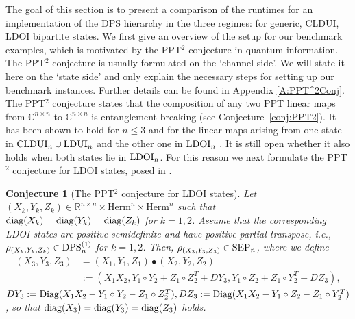 \documentclass[11pt]{article}
\newcommand{\R}{\ensuremath{\mathbb{R}}}   %
\newcommand{\C}{\ensuremath{\mathbb{C}}} %
\newcommand{\Herm}{\mathrm{Herm}}
\newcommand{\SEP}{\text{\rm SEP}}
\newcommand{\CLDUI}{\text{\rm CLDUI}}
\newcommand{\LDUI}{\text{\rm LDUI}}
\newcommand{\LDOI}{\text{\rm LDOI}}
\newcommand{\DPS}{\text{\rm DPS}}
\newcommand{\diag}{\text{\rm diag}}
\newcommand{\Diag}{\text{\rm Diag}}
\theoremstyle{plain}
\newtheorem{conjecture}[satz]{Conjecture}
\begin{document}
The goal of this section is to present a comparison of the runtimes for an implementation of the DPS hierarchy in the three   regimes: for generic, CLDUI,  LDOI bipartite states. We first give an overview of the setup for our benchmark examples, which is motivated by the PPT$^2$ conjecture in quantum information. The PPT$^2$ conjecture is usually formulated on the `channel side'. We will state it here on the `state side' and only explain the necessary steps for setting up our benchmark instances. Further details can be found in Appendix \ref{A:PPT^2Conj}. The PPT$^2$ conjecture states that the composition of any two {PPT} linear maps from $\C^{n\times n}$ to $\C^{n\times n}$ is entanglement breaking (see Conjecture~\ref{conj:PPT2}). It has been shown to hold  for $n\leq3$ \cite{CMHW-2018,CYT-2019} and for the linear maps arising from one state in $\CLDUI_n\cup\LDUI_n$ and the other one in $\LDOI_n$ \cite{Singh-Nechita-PPT2,Nechita-Park_2025}. It is still open whether it also holds when both states lie in $\LDOI_n$.
For this reason we next formulate the PPT$^2$ conjecture for LDOI states, posed in \cite[Conjecture 5.1]{Singh-Nechita-PPT2}.

\begin{conjecture}[The PPT$^2$ conjecture for LDOI states]\label{conj:LDOIstates}
Let $(X_k,Y_k,Z_k)\in \R^{n\times n}\times\Herm^n\times\Herm^n$ such that $\diag(X_k)=\diag(Y_k)=\diag(Z_k)$ for $k=1,2$.
Assume that the corresponding LDOI states are positive semidefinite and have positive partial transpose, i.e.,  $\rho_{(X_k,Y_k,Z_k)}\in \DPS^{(1)}_n$ for $k=1,2$.
Then,   $\rho_{(X_3,Y_3,Z_3)}\in\SEP_n$, where we define 
\begin{align*}
(X_3,Y_3,Z_3)& =(X_1,Y_1,Z_1)\bullet(X_2,Y_2,Z_2)\\
& :=(X_1X_2,Y_1\circ Y_2+Z_1\circ Z_2^T+DY_3,Y_1\circ Z_2+Z_1\circ Y_2^T+DZ_3),
\end{align*}
$DY_3:=\Diag(X_1X_2-Y_1\circ Y_2-Z_1\circ Z_2^T), DZ_3:=\Diag(X_1X_2-Y_1\circ Z_2-Z_1\circ Y_2^T)$, so that 
 $\diag(X_3)=\diag(Y_3)=\diag(Z_3)$ holds.
\end{conjecture}
\end{document}
